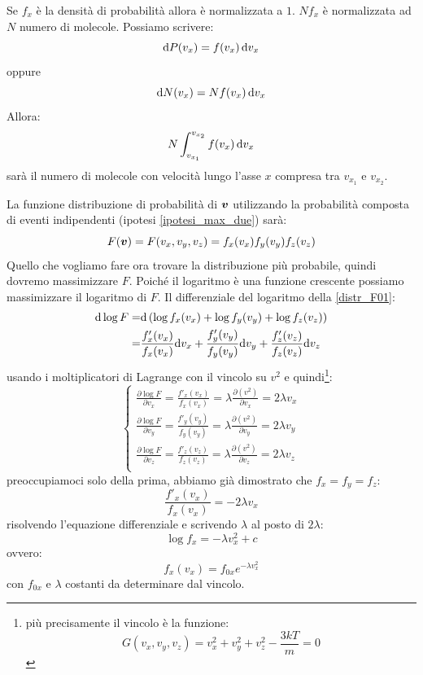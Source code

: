 Se $f_x$ è la densità di probabilità allora è normalizzata a $1$. $Nf_x$ è normalizzata ad $N$ numero di molecole. Possiamo scrivere:
\[\mathrm{d} P(v_x) = f(v_x)\,\mathrm{d} v_x\]
oppure
\[\mathrm{d} N(v_x) = Nf(v_x)\,\mathrm{d} v_x\]
Allora:
\begin{equation}
	N\int_{v_{x_1}}^{v_{x_2}} f(v_x)\,\mathrm{d} v_x
\end{equation}
sarà il numero di molecole con velocità lungo l'asse $x$ compresa tra $v_{x_1}$ e $v_{x_2}$.

La funzione distribuzione di probabilità di $\boldsymbol{v}$ utilizzando la probabilità composta di eventi indipendenti (ipotesi \ref{ipotesi_max_due}) sarà:
\begin{equation}
	F(\boldsymbol{v})=F(v_x,v_y,v_z)=f_x(v_x)f_y(v_y)f_z(v_z)
	\label{distr_F01}
\end{equation}
Quello che vogliamo fare ora trovare la distribuzione più probabile, quindi dovremo massimizzare $F$. Poiché il logaritmo è una funzione crescente possiamo massimizzare il logaritmo di $F$. Il differenziale del logaritmo della \eqref{distr_F01}:
\begin{equation}
	\begin{split}
		\mathrm{d} \log F=&\mathrm{d}\left(\log f_x(v_x)+\log f_y(v_y)+\log f_z(v_z)\right)\\
		=&\frac{f'_x(v_x)}{f_x(v_x)}\mathrm{d} v_x+\frac{f'_y(v_y)}{f_y(v_y)}\mathrm{d} v_y+\frac{f'_z(v_z)}{f_z(v_z)}\mathrm{d} v_z
	\end{split}
\end{equation}
usando i moltiplicatori di Lagrange con il vincolo su $v^2$ e quindi\footnote{più precisamente il vincolo è la funzione:
	\begin{equation}
		G(v_x,v_y,v_z)=v_x^2+v_y^2+v_z^2-\frac{3kT}{m}=0
	\end{equation}
}:
\begin{equation}
	\left\{
	\begin{array}{l}
		\frac{\partial\log F}{\partial v_x}=\frac{f'_x(v_x)}{f_x(v_x)}=\lambda\frac{\partial(v^2)}{\partial v_x}=2\lambda v_x \\
		\frac{\partial\log F}{\partial v_y}=\frac{f'_y(v_y)}{f_y(v_y)}=\lambda\frac{\partial(v^2)}{\partial v_y}=2\lambda v_y \\
		\frac{\partial\log F}{\partial v_z}=\frac{f'_z(v_z)}{f_z(v_z)}=\lambda\frac{\partial(v^2)}{\partial v_z}=2\lambda v_z \\
	\end{array}
	\right.
\end{equation}
preoccupiamoci solo della prima, abbiamo già dimostrato che $f_x=f_y=f_z$:
\begin{equation}
	\frac{f'_x(v_x)}{f_x(v_x)}=-2\lambda v_x
\end{equation}
risolvendo l'equazione differenziale e scrivendo $\lambda$ al posto di $2\lambda$:
\begin{equation}
	\log f_x=-\lambda v_x^2+c
\end{equation}
ovvero:
\begin{equation}
	f_x(v_x)=f_{0x}e^{-\lambda v_x^2}
\end{equation}
con $f_{0x}$ e $\lambda$ costanti da determinare dal vincolo.
